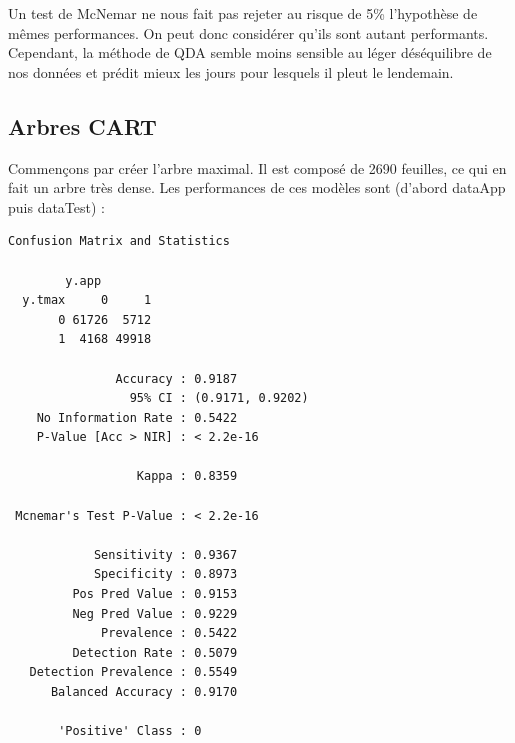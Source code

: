 \documentclass{article}
\begin{document}
Un test de McNemar ne nous fait pas rejeter au risque de 5\% l'hypothèse de mêmes performances. On peut donc considérer qu'ils sont autant performants. Cependant, la méthode de QDA semble moins sensible au léger déséquilibre de nos données et prédit mieux les jours pour lesquels il pleut le lendemain. 

\subsection{Arbres CART}

Commençons par créer l'arbre maximal. Il est composé de 2690 feuilles, ce qui en fait un arbre très dense. Les performances de ces modèles sont (d'abord dataApp puis dataTest) : 
\begin{verbatim}
Confusion Matrix and Statistics

        y.app
  y.tmax     0     1
       0 61726  5712
       1  4168 49918
                                            
               Accuracy : 0.9187          
                 95% CI : (0.9171, 0.9202)
    No Information Rate : 0.5422          
    P-Value [Acc > NIR] : < 2.2e-16       
                                          
                  Kappa : 0.8359          
                                          
 Mcnemar's Test P-Value : < 2.2e-16       
                                          
            Sensitivity : 0.9367          
            Specificity : 0.8973          
         Pos Pred Value : 0.9153          
         Neg Pred Value : 0.9229          
             Prevalence : 0.5422          
         Detection Rate : 0.5079          
   Detection Prevalence : 0.5549          
      Balanced Accuracy : 0.9170          
                                          
       'Positive' Class : 0    

\end{verbatim}
\end{document}
